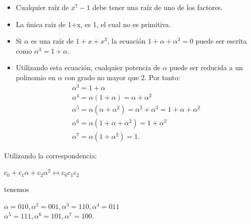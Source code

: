 \begin{frame}  \footnotesize

\begin{itemize} 


\item  Cualquier raíz de $x^7-1$ debe tener una raíz de uno de los factores. 

\item La única raíz de 1+x, es 1, el cual no es primitiva. 

\item Si $\alpha$ es una raíz de $1+x+x^3$, la ecuación $1+\alpha+\alpha^3=0$ puede ser escrita como $\alpha^3=1+\alpha$. 

\item Utilizando esta ecuación, cualquier potencia de $\alpha$ puede ser reducida a un polinomio en $\alpha$ con grado no mayor que 2. Por tanto:
\[
     \begin{array}{l}
     				\alpha^3	=1+\alpha\\
					\alpha^4	=\alpha (1+\alpha)=\alpha +\alpha^2\\
					\alpha^5	=\alpha (\alpha +\alpha^2)=\alpha^2 +\alpha^3 =1+\alpha +\alpha^2\\
					\alpha^6	=\alpha (1+\alpha +\alpha^2)=1+\alpha^2\\
					\alpha^7	=\alpha(1+\alpha^2)=1.
           			\end{array} 		
\]
\end{itemize} 



Utilizando la correspondencia: \\

\begin{center}
$c_0+c_1\alpha +c_2\alpha^2 \leftrightarrow c_0c_1c_2$
\end{center}

tenemos\\

\begin{center}
$\alpha	= 010,	\alpha^2	= 001,	\alpha^3	= 110,	\alpha^4	= 011 $\\
$\alpha^5	= 111,	\alpha^6	= 101,	\alpha^7	= 100.$
\end{center}

\end{frame} 
